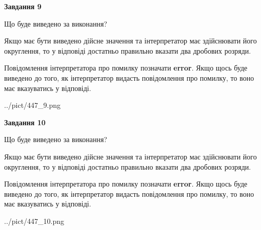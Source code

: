 \documentclass[12pt, ukrainian]{article}
\begin{document}
{\begin {Large}
{\begin {center}\textbf{Завдання 9}\end {center}}\par
Що буде виведено за виконання? \par

Якщо має бути виведено дійсне значення та інтерпретатор має здійснювати його округлення, 
то у відповіді достатньо правильно вказати два дробових розряди.

Повідомлення інтерпретатора про помилку позначати \textbf{error}.
Якщо щось буде виведено до того, як інтерпретатор видасть повідомлення про помилку, 
то воно має вказуватись у відповіді. \par

\begin{center}
	{../pict/447_9.png}
\end{center}
\newpage

{\begin {center}\textbf{Завдання 10}\end {center}}\par
Що буде виведено за виконання? \par

Якщо має бути виведено дійсне значення та інтерпретатор має здійснювати його округлення, 
то у відповіді достатньо правильно вказати два дробових розряди.

Повідомлення інтерпретатора про помилку позначати \textbf{error}.
Якщо щось буде виведено до того, як інтерпретатор видасть повідомлення про помилку, 
то воно має вказуватись у відповіді. \par

\begin{center}
	{../pict/447_10.png}
\end{center}
\newpage

\end {Large}}
\end{document}

